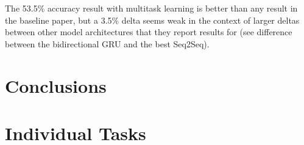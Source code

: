 \documentclass{article}
\begin{document}
The 53.5\% accuracy result with multitask learning
is better than any result in the baseline paper,
but a 3.5\% delta seems weak
in the context of larger deltas between other model architectures
that they report results for
(see difference between the bidirectional GRU and the best Seq2Seq).

\section*{Conclusions}



\section*{Individual Tasks}

{}

\end{document}
